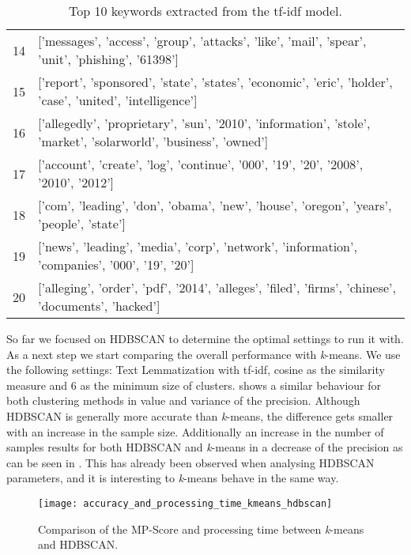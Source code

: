 \begin{table}[h]
{\begin{tabular}{rl}
            14 & ['messages', 'access', 'group', 'attacks', 'like', 'mail', 'spear', 'unit', 'phishing', '61398']                        \\
            15 & ['report', 'sponsored', 'state', 'states', 'economic', 'eric', 'holder', 'case', 'united', 'intelligence']              \\
            16 & ['allegedly', 'proprietary', 'sun', '2010', 'information', 'stole', 'market', 'solarworld', 'business', 'owned']        \\
            17 & ['account', 'create', 'log', 'continue', '000', '19', '20', '2008', '2010', '2012']                                     \\
            18 & ['com', 'leading', 'don', 'obama', 'new', 'house', 'oregon', 'years', 'people', 'state']                                \\
            19 & ['news', 'leading', 'media', 'corp', 'network', 'information', 'companies', '000', '19', '20']                          \\
            20 & ['alleging', 'order', 'pdf', '2014', 'alleges', 'filed', 'firms', 'chinese', 'documents', 'hacked']                     \\
        \hline
        \end{tabular}
        }
        \caption{Top 10 keywords extracted from the tf-idf model.}
        \label{tab:clustering_example_features}
\end{table}

So far we focused on HDBSCAN to determine the optimal settings to run it with.
As a next step we start comparing the overall performance with \textit{k}-means.
We use the following settings: Text Lemmatization with tf-idf,
cosine as the similarity measure and 6 as the minimum size of clusters.
 shows a similar behaviour
for both clustering methods in value and variance of the precision.
Although HDBSCAN is generally more accurate than \textit{k}-means,
the difference gets smaller with an increase in the sample size.
Additionally an increase in the number of samples results for both HDBSCAN
and \textit{k}-means in a decrease of the precision
as can be seen in .
This has already been observed when analysing HDBSCAN parameters, 
and it is interesting to \textit{k}-means behave in the same way.

\begin{figure}[h]
    \centering
    \texttt{[image: accuracy\_and\_processing\_time\_kmeans\_hdbscan]}
    \caption{Comparison of the MP-Score and processing time between \textit{k}-means and HDBSCAN.}
    \label{fig:precision_and_processing_time_kmeans_hdbscan}
\end{figure}

